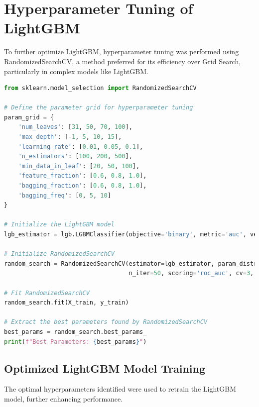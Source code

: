 \documentclass[12pt,a4paper]{report}
\begin{document}
\section{Hyperparameter Tuning of LightGBM}

To further optimize LightGBM, hyperparameter tuning was performed using RandomizedSearchCV, a method preferred for its efficiency over Grid Search, particularly in complex models like LightGBM.\\

\begin{lstlisting}[language=Python, caption={Hyperparameter Tuning Using RandomizedSearchCV}]
from sklearn.model_selection import RandomizedSearchCV

# Define the parameter grid for hyperparameter tuning
param_grid = {
    'num_leaves': [31, 50, 70, 100],
    'max_depth': [-1, 5, 10, 15],
    'learning_rate': [0.01, 0.05, 0.1],
    'n_estimators': [100, 200, 500],
    'min_data_in_leaf': [20, 50, 100],
    'feature_fraction': [0.6, 0.8, 1.0],
    'bagging_fraction': [0.6, 0.8, 1.0],
    'bagging_freq': [0, 5, 10]
}

# Initialize the LightGBM model
lgb_estimator = lgb.LGBMClassifier(objective='binary', metric='auc', verbose=-1)

# Initialize RandomizedSearchCV
random_search = RandomizedSearchCV(estimator=lgb_estimator, param_distributions=param_grid, 
                                   n_iter=50, scoring='roc_auc', cv=3, verbose=1, random_state=59, n_jobs=-1)

# Fit RandomizedSearchCV
random_search.fit(X_train, y_train)

# Extract the best parameters found by RandomizedSearchCV
best_params = random_search.best_params_
print(f"Best Parameters: {best_params}")
\end{lstlisting}

\subsection{Optimized LightGBM Model Training}

The optimal hyperparameters identified were used to retrain the LightGBM model, further enhancing performance.\\
\end{document}
